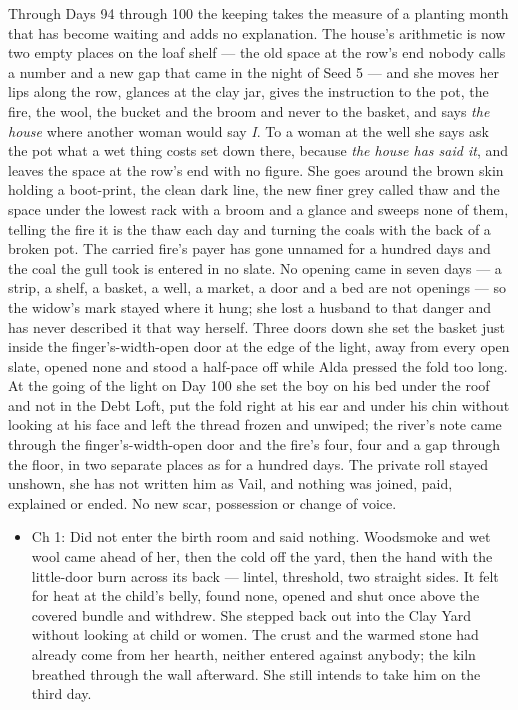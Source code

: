 \documentclass{design/chronicle}
\begin{document}
{Through Days 94 through 100 the keeping takes the measure of a planting month that has become waiting and adds no explanation. The house’s arithmetic is now two empty places on the loaf shelf --- the old space at the row’s end nobody calls a number and a new gap that came in the night of Seed 5 --- and she moves her lips along the row, glances at the clay jar, gives the instruction to the pot, the fire, the wool, the bucket and the broom and never to the basket, and says \emph{the house} where another woman would say \emph{I}. To a woman at the well she says ask the pot what a wet thing costs set down there, because \emph{the house has said it}, and leaves the space at the row’s end with no figure. She goes around the brown skin holding a boot-print, the clean dark line, the new finer grey called thaw and the space under the lowest rack with a broom and a glance and sweeps none of them, telling the fire it is the thaw each day and turning the coals with the back of a broken pot. The carried fire’s payer has gone unnamed for a hundred days and the coal the gull took is entered in no slate. No opening came in seven days --- a strip, a shelf, a basket, a well, a market, a door and a bed are not openings --- so the widow’s mark stayed where it hung; she lost a husband to that danger and has never described it that way herself. Three doors down she set the basket just inside the finger’s-width-open door at the edge of the light, away from every open slate, opened none and stood a half-pace off while Alda pressed the fold too long. At the going of the light on Day 100 she set the boy on his bed under the roof and not in the Debt Loft, put the fold right at his ear and under his chin without looking at his face and left the thread frozen and unwiped; the river’s note came through the finger’s-width-open door and the fire’s four, four and a gap through the floor, in two separate places as for a hundred days. The private roll stayed unshown, she has not written him as Vail, and nothing was joined, paid, explained or ended. No new scar, possession or change of voice.

\begin{itemize}[leftmargin=1.4em,itemsep=1pt,topsep=3pt,parsep=0pt]

\item Ch 1: Did not enter the birth room and said nothing. Woodsmoke and wet wool came ahead of her, then the cold off the yard, then the hand with the little-door burn across its back --- lintel, threshold, two straight sides. It felt for heat at the child’s belly, found none, opened and shut once above the covered bundle and withdrew. She stepped back out into the Clay Yard without looking at child or women. The crust and the warmed stone had already come from her hearth, neither entered against anybody; the kiln breathed through the wall afterward. She still intends to take him on the third day.


\end{itemize}}
\end{document}
